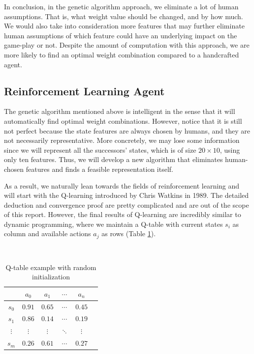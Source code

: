 \documentclass[letterpaper]{article} %
\begin{document}
In conclusion, in the genetic algorithm approach, we eliminate a lot of human assumptions. That is, what weight value should be changed, and by how much. We would also take into consideration more features that may further eliminate human assumptions of which feature could have an underlying impact on the game-play or not. Despite the amount of computation with this approach, we are more likely to find an optimal weight combination compared to a handcrafted agent.


\subsection{Reinforcement Learning Agent}

The genetic algorithm mentioned above is intelligent in the sense that it will automatically find optimal weight combinations. However, notice that it is still not perfect because the state features are always chosen by humans, and they are not necessarily representative. More concretely, we may lose some information since we will represent all the successors' states, which is of size $20\times 10$, using only ten features. Thus, we will develop a new algorithm that eliminates human-chosen features and finds a feasible representation itself.

As a result, we naturally lean towards the fields of reinforcement learning and will start with the Q-learning introduced by Chris Watkins in 1989. The detailed deduction and convergence proof are pretty complicated and are out of the scope of this report. However, the final results of Q-learning are incredibly similar to dynamic programming, where we maintain a Q-table with current states $s_i$ as column and available actions $a_j$ as rows (Table \ref{tab:qtable}).

$\,$
\begin{table}[h!]
  \centering
  \normalsize{
    \begin{tabular}{ |c|c|c|c|c|c| } 
      \hline
       & $a_{0}$ & $a_{1}$ & $\cdots$ & $a_{n}$  \\ 
      \hline
       $s_{0}$ & $0.91$ & $0.65$ &$\cdots $ &$0.45$  \\ 
       \hline
       $s_{1}$ & $0.86$ & $0.14$ &$\cdots $ &$0.19$  \\ 
       \hline
       $\vdots$ & $\vdots$ & $\vdots$ &$\ddots $ &$\vdots$  \\ 
       \hline
       $s_{m}$ & $0.26$ & $0.61$ &$\cdots $ &$0.27$  \\ 
       \hline
      \end{tabular}}
  \caption{Q-table example with random initialization}
  \label{tab:qtable}
\end{table}
\end{document}

